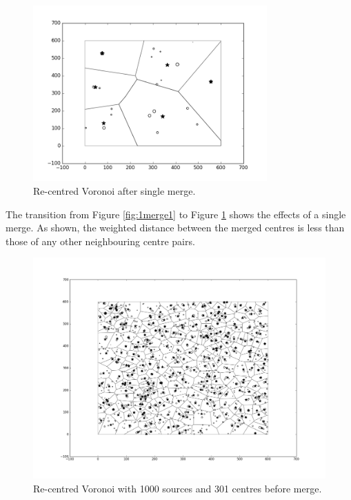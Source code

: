 \begin{figure}[H]
\centering
  \includegraphics[width=0.8\textwidth]{Images/1merge2.png}
  \caption{Re-centred Voronoi after single merge.}
  \label{fig:1merge2}
\end{figure}
The transition from Figure \ref{fig:1merge1} to Figure \ref{fig:1merge2} shows the effects of a single merge. As shown, the weighted distance between the merged centres is less than those of any other neighbouring centre pairs.
\begin{figure}[H]
\centering
  \includegraphics[width=\linewidth]{Images/merge1.png}
  \caption{Re-centred Voronoi with 1000 sources and 301 centres before merge.}
  \label{fig:merge1}
\end{figure}
